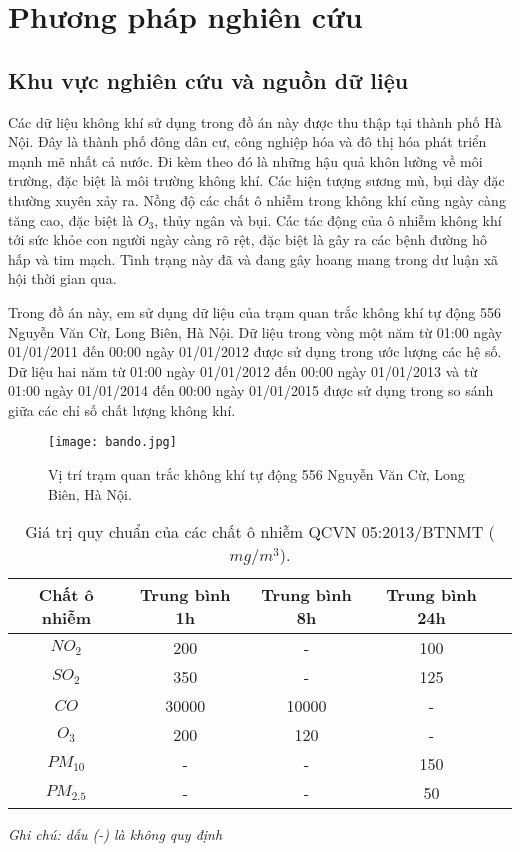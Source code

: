 \documentclass[14pt]{extreport}
\theoremstyle{definition}
\theoremstyle{plain}
\theoremstyle{remark}
\begin{document}
\chapter{Phương pháp nghiên cứu}
\section{Khu vực nghiên cứu và nguồn dữ liệu}
Các dữ liệu không khí sử dụng trong đồ án này được thu thập tại thành phố Hà Nội. Đây là thành phố đông dân cư, công nghiệp hóa và đô thị hóa phát triển mạnh mẽ nhất cả nước. Đi kèm theo đó là những hậu quả khôn lường về môi trường, đặc biệt là môi trường không khí. Các hiện tượng sương mù, bụi dày đặc thường xuyên xảy ra. Nồng độ các chất ô nhiễm trong không khí cũng ngày càng tăng cao, đặc biệt là $O_3$, thủy ngân và bụi. Các tác động của ô nhiễm không khí tới sức khỏe con người ngày càng rõ rệt, đặc biệt là gây ra các bệnh đường hô hấp và tim mạch. Tình trạng này đã và đang gây hoang mang trong dư luận xã hội thời gian qua.

Trong đồ án này, em sử dụng dữ liệu của trạm quan trắc không khí tự động 556 Nguyễn Văn Cừ, Long Biên, Hà Nội. Dữ liệu trong vòng một năm từ 01:00 ngày 01/01/2011 đến 00:00 ngày 01/01/2012 được sử dụng trong ước lượng các hệ số. Dữ liệu hai năm từ 01:00 ngày 01/01/2012 đến 00:00 ngày 01/01/2013 và từ 01:00 ngày 01/01/2014 đến 00:00 ngày 01/01/2015 được sử dụng trong so sánh giữa các chỉ số chất lượng không khí.

\begin{figure}
\begin{center}
\texttt{[image: bando.jpg]}
\end{center}
\caption{Vị trí trạm quan trắc không khí tự động 556 Nguyễn Văn Cừ, Long Biên, Hà Nội.}
\end{figure}


\begin{table}
\begin{tabular}{|c|c|c|c|c|} 
 \hline
\hspace{0.2cm}Chất ô nhiễm \hspace{0.2cm} & \hspace{0.2cm}Trung bình 1h\hspace{0.2cm} & \hspace{0.2cm}Trung bình 8h\hspace{0.2cm} & \hspace{0.2cm}Trung bình 24h\hspace*{0.2cm} \\
 \hline\hline
 $NO_2$ & 200 & - & 100\\
 $SO_2$ & 350 & - & 125\\
 $CO$ & 30000 & 10000 & -\\
 $O_3$ & 200 & 120 & -\\
 $PM_{10}$ & - & - & 150\\
 $PM_{2.5}$ & - & - & 50\\
 \hline
\end{tabular}
\caption{Giá trị quy chuẩn của các chất ô nhiễm QCVN 05:2013/BTNMT ($mg/m^3$).}
\textit{\small{Ghi chú: dấu (-) là không quy định}}
\end{table}
\end{document}
